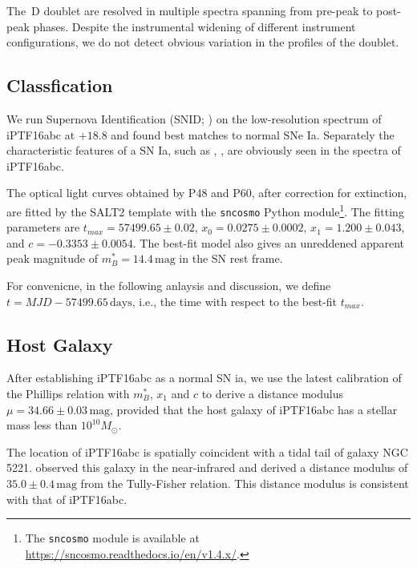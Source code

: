 \documentclass[twocolumn]{aastex61}
\newcommand{\sm}{M_\odot}
\begin{document}
The \,D doublet are resolved in multiple spectra spanning
from pre-peak to post-peak phases. Despite the instrumental widening of
different instrument configurations, we do not detect obvious variation
in the profiles of the doublet.


\subsection{Classfication}
\label{sec:classification}

We run Supernova Identification (SNID; \citealt{2007ApJ...666.1024B})
on the low-resolution spectrum of iPTF16abc at $+18.8$ and found best
matches to normal SNe Ia. Separately the characteristic features of a
SN Ia, such as , , are obviously seen in the
spectra of iPTF16abc. 

The optical light curves obtained by P48 and P60, after correction for
extinction, are fitted by the SALT2 template
\citep{2007A&A...466...11G} with the \texttt{sncosmo} Python
module\footnote{The \texttt{sncosmo} module is available at
  \url{https://sncosmo.readthedocs.io/en/v1.4.x/}.}. The fitting
parameters are $t_{max}=57499.65\pm0.02$, $x_0=0.0275\pm0.0002$,
$x_1=1.200\pm0.043$, and $c=-0.3353\pm0.0054$. The best-fit model also
gives an unreddened apparent peak magnitude of
$m^*_{B}=14.4\,\textrm{mag}$ in the SN rest frame.

For convenicne, in the following anlaysis and discussion, we define
$t=MJD - 57499.65\,\textrm{days}$, i.e., the time with respect to the
best-fit $t_{max}$. 

\subsection{Host Galaxy}
\label{sec:host}

After establishing iPTF16abc as a normal SN ia, we use the latest
calibration \citep{2014A&A...568A..22B} of the Phillips relation
\citep{1993ApJ...413L.105P} with $m^*_{B}$, $x_1$ and $c$ to derive a
distance modulus $\mu=34.66\pm0.03\,\textrm{mag}$, provided that the
host galaxy of iPTF16abc has a stellar mass less than $10^{10}\sm$.

The location of iPTF16abc is spatially coincident with a tidal tail of
galaxy NGC\,5221. \citet{2007A&A...465...71T} observed this galaxy in
the near-infrared and derived a distance modulus of $35.0\pm0.4\,\textrm{mag}$
from the Tully-Fisher relation. This distance modulus is consistent
with that of iPTF16abc.
\end{document}
